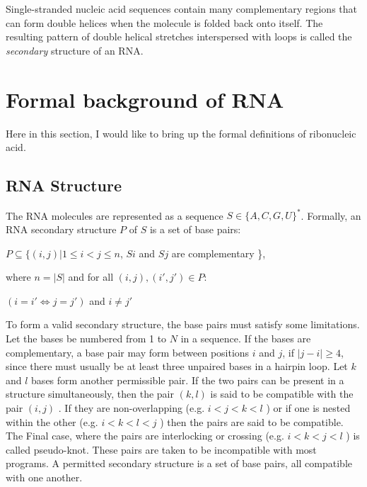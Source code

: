 \documentclass[twoside,a4paper]{report}
\numberwithin{equation}{section}
\begin{document}
	Single-stranded nucleic acid sequences contain many complementary regions that can form double helices when the molecule is folded back onto itself. The resulting pattern of double helical stretches interspersed with loops is called the \textit{secondary} structure of an RNA.\\
	
	\section{Formal background of RNA}
	Here in this section, I would like to bring up the formal definitions of ribonucleic acid.
	\subsection{RNA Structure}
	The RNA molecules are represented as a sequence $S \in \{A, C, G, U\} ^*$.
	Formally, an RNA secondary structure $P$ of $S$ is a set of base pairs:\\
	\begin{center}
	 $ P \subseteq \{(i, j) | 1 \leq i < j \leq n $, $ Si $ and $Sj$ are complementary \},\\
	\end{center}
	where $ n = |S| $ and for all $(i, j) , ( i', j' ) \in  P:$\\
	\begin{center}
	$(i = i' \Leftrightarrow j = j')$ and $ i \neq j'$ \\
	\end{center}

	To form a valid secondary structure, the base pairs must satisfy some limitations. Let the bases be numbered from 1 to $N$ in a sequence. If the bases are complementary, a base pair may form between positions $i$ and $j$, if $|j - i | \geq 4$, since there must usually be at least three unpaired bases in a hairpin loop. Let $k$ and $l$ bases form another permissible  pair. If the two pairs can be present in a structure simultaneously, then the pair $(k,l)$ is said to be compatible with the pair $(i,j)$ . If they are non-overlapping (e.g. $i<j<k<l$ ) or if one is nested within the other (e.g. $i<k<l<j$ ) then the pairs are said to be compatible. The Final case, where the pairs are interlocking or crossing (e.g. $i<k<j<l$ ) is called  pseudo-knot. These pairs are taken to be incompatible with
	most programs. A permitted secondary structure is a set of base pairs, all compatible with one another.\\
	
\end{document}
